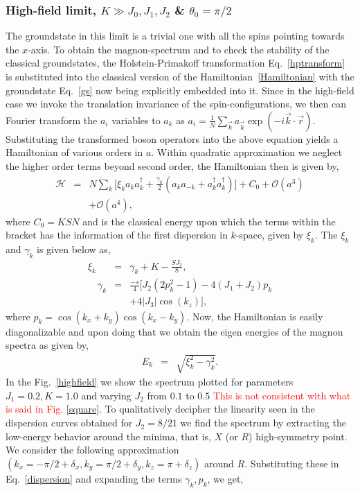 \subsubsection{High-field limit, $K \gg J_0,J_1,J_2$ \& $\theta_0=\pi/2$}
\indent \indent The groundstate in this limit is a trivial one with all the spins pointing towards the $x$-axis. To obtain the magnon-spectrum and to check the stability of the classical groundstates, the Holstein-Primakoff transformation Eq.~\eqref{hptransform} is substituted into the classical version of the  Hamiltonian~\ref{Hamiltonian} with the groundstate Eq.~\eqref{gs} now being explicitly embedded into it. Since in the high-field case we invoke the translation invariance of the spin-configurations, we then can Fourier transform the $a_i$ variables to $a_k$ as $a_i=\frac{1}{N}\sum_{\vec{k}}a_{\vec{k}}\exp({-i\vec{k}\cdot\vec{r}})$. Substituting the transformed boson operators into the above equation yields a Hamiltonian of various orders in $a$. Within quadratic approximation we neglect the higher order terms beyond second order, the Hamiltonian then is given by,
\begin{eqnarray}
\mathcal{H}&=&N\sum\limits_{k}\bigg[\xi_ka_ka^\dagger_k + \frac{\gamma_k}{2}(a_ka_{-k} + a^\dagger_k a^\dagger_k)\bigg] +  C_0 + \mathcal{O}(a^3)\nonumber \\
&&+ \mathcal{O}(a^4),
\end{eqnarray}
where $C_0=KSN$ and is the classical energy upon which the terms within the bracket has the information of the first dispersion in $k$-space, given by $\xi_k$. The $\xi_k$ and $\gamma_k$ is given below as,
\begin{eqnarray}
\xi_k&=&\gamma_k + K -\frac{SJ_2}{8},\\
\label{pk}
\quad \gamma_k &=&\frac{-s}{4}\big[J_2(2 p_k^2 -1) - 4(J_1+J_2)p_k\nonumber \\
&&+ 4|J_3|\cos(k_z)\big],
\end{eqnarray}
where $p_k=\cos(k_x+k_y)\cos(k_x-k_y)$. Now, the Hamiltonian is easily diagonalizable and upon doing that we obtain the eigen energies of the magnon spectra as given by,
\begin{eqnarray}
\label{dispersion}
E_k&=& \sqrt{\xi^2_k - \gamma_k^2}.
\end{eqnarray}
\indent In the Fig.~\ref{highfield} we show the spectrum plotted for parameters $J_1=0.2, K=1.0$ and varying $J_2$ from $0.1$ to $0.5$ \textcolor{red}{This is not consistent with what is said in Fig. \ref{square}}. To qualitatively decipher the linearity seen in the dispersion curves obtained for $J_2=8/21$ we find the spectrum by extracting the low-energy behavior around the minima, that is, $X$ (or $R$) high-symmetry point. We consider the following approximation $(k_x=-\pi/2 + \delta_x, k_y=\pi/2 + \delta_y, k_z=\pi + \delta_z)$ around $R$. Substituting these in Eq.~\eqref{dispersion} and expanding the terms $\gamma_k, p_k$, we get,
